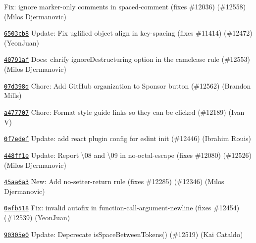\begin{DoxyItemize}
\item \href{https://github.com/eslint/eslint/commit/1110045e0d28a461e75d2f57d5f01533d59ef239}{\texttt{ {}}} Fix\+: ignore marker-\/only comments in spaced-\/comment (fixes \#12036) (\#12558) (Milos Djermanovic)
\item \href{https://github.com/eslint/eslint/commit/6503cb8d99e549fece53b80b110e890a7978b9fd}{\texttt{ {\ttfamily 6503cb8}}} Update\+: Fix uglified object align in key-\/spacing (fixes \#11414) (\#12472) (Yeon\+Juan)
\item \href{https://github.com/eslint/eslint/commit/40791af69efde1701690637603ad37d41e15a727}{\texttt{ {\ttfamily 40791af}}} Docs\+: clarify ignore\+Destructuring option in the camelcase rule (\#12553) (Milos Djermanovic)
\item \href{https://github.com/eslint/eslint/commit/07d398d91d5b6d0247e58b1f8ea64bb5acd570a8}{\texttt{ {\ttfamily 07d398d}}} Chore\+: Add Git\+Hub organization to Sponsor button (\#12562) (Brandon Mills)
\item \href{https://github.com/eslint/eslint/commit/a47770706ac59633dcd73e886d1a7282b324ee06}{\texttt{ {\ttfamily a477707}}} Chore\+: Format style guide links so they can be clicked (\#12189) (Ivan V)
\item \href{https://github.com/eslint/eslint/commit/0f7edefdc1576d5e3e7ef89083002b0a4a31f039}{\texttt{ {\ttfamily 0f7edef}}} Update\+: add react plugin config for eslint init (\#12446) (Ibrahim Rouis)
\item \href{https://github.com/eslint/eslint/commit/448ff1e53734c503fb9e7e6802c1c7e441d4c019}{\texttt{ {\ttfamily 448ff1e}}} Update\+: Report \textquotesingle{}\textbackslash{}08\textquotesingle{} and \textquotesingle{}\textbackslash{}09\textquotesingle{} in no-\/octal-\/escape (fixes \#12080) (\#12526) (Milos Djermanovic)
\item \href{https://github.com/eslint/eslint/commit/45aa6a3ba3486f1b116c5daab6432d144e5ea574}{\texttt{ {\ttfamily 45aa6a3}}} New\+: Add no-\/setter-\/return rule (fixes \#12285) (\#12346) (Milos Djermanovic)
\item \href{https://github.com/eslint/eslint/commit/0afb518d1f139376245613dddd8eaef32b52d619}{\texttt{ {\ttfamily 0afb518}}} Fix\+: invalid autofix in function-\/call-\/argument-\/newline (fixes \#12454) (\#12539) (Yeon\+Juan)
\item \href{https://github.com/eslint/eslint/commit/90305e017c2c5fba0b4b62f41b180910b4baeedb}{\texttt{ {\ttfamily 90305e0}}} Update\+: Depcrecate is\+Space\+Between\+Tokens() (\#12519) (Kai Cataldo)

\end{DoxyItemize}
